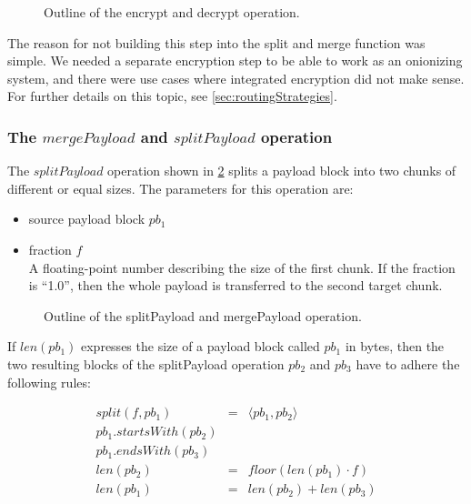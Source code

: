 \begin{figure}[ht]\centering
	\resizebox{0.35\textwidth}{!}{}
	\resizebox{0.35\textwidth}{!}{}
	\caption{Outline of the encrypt and decrypt operation.}
	\label{fig:encryptOperation}
\end{figure}

The reason for not building this step into the split and merge function was simple. We needed a separate encryption step to be able to work as an onionizing system, and there were use cases where integrated encryption did not make sense. For further details on this topic, see \cref{sec:routingStrategies}.


\subsubsection{The \texorpdfstring{$mergePayload$ and $splitPayload$}{mergePayload and splitPayload} operation}\label{sec:mergeAndSplit}
The $splitPayload$ operation shown in \cref{fig:mergeOperation} splits a payload block into two chunks of different or equal sizes. The parameters for this operation are:

\begin{itemize}
	\item source payload block $pb_1$
	\item fraction $f$\\
	A floating-point number describing the size of the first chunk. If the fraction is ``1.0'', then the whole payload is transferred to the second target chunk.
\end{itemize}

\begin{figure}[ht]\centering
	\resizebox{0.43\textwidth}{!}{}
	\resizebox{0.35\textwidth}{!}{}
	\caption{Outline of the splitPayload and mergePayload operation.}
	\label{fig:mergeOperation}
\end{figure}
If $len(pb_1)$ expresses the size of a payload block called $pb_1$ in bytes, then the two resulting blocks of the splitPayload operation $pb_2$ and $pb_3$ have to adhere the following rules:

\begin{eqnarray}
	split(f, pb_1) & = &\langle pb_1, pb_2 \rangle\\
	pb_1.startsWith(pb_2)\\
	pb_1.endsWith(pb_3)\\
	len(pb_2) & = & floor(len(pb_1)\cdot f)\\
	len(pb_1) & = & len(pb_2) + len(pb_3)
\end{eqnarray}

